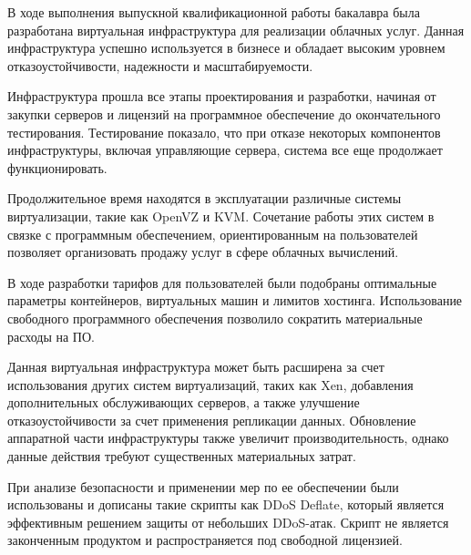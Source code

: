 
В ходе выполнения выпускной квалификационной работы бакалавра была разработана виртуальная инфраструктура для реализации облачных услуг.
Данная инфраструктура успешно используется в бизнесе и обладает высоким уровнем отказоустойчивости, надежности и масштабируемости.

Инфраструктура прошла все этапы проектирования и разработки, начиная от закупки серверов и лицензий на программное обеспечение до окончательного тестирования.
Тестирование показало, что при отказе некоторых компонентов инфраструктуры, включая управляющие сервера, система все еще продолжает функционировать.

Продолжительное время находятся в эксплуатации различные системы виртуализации, такие как OpenVZ и KVM.
Сочетание работы этих систем в связке с программным обеспечением, ориентированным на пользователей позволяет организовать продажу услуг в сфере облачных вычислений.

В ходе разработки тарифов для пользователей были подобраны оптимальные параметры контейнеров, виртуальных машин и лимитов хостинга.
Использование свободного программного обеспечения позволило сократить материальные расходы на ПО.

Данная виртуальная инфраструктура может быть расширена за счет использования других систем виртуализаций, таких как Xen, добавления дополнительных обслуживающих серверов, а также улучшение отказоустойчивости за счет применения репликации данных.
Обновление аппаратной части инфраструктуры также увеличит производительность, однако данные действия требуют существенных материальных затрат.

При анализе безопасности и применении мер по ее обеспечении были использованы и дописаны такие скрипты как DDoS Deflate, который является эффективным решением защиты от небольших DDoS-атак.
Скрипт не является законченным продуктом и распространяется под свободной лицензией.

\clearpage